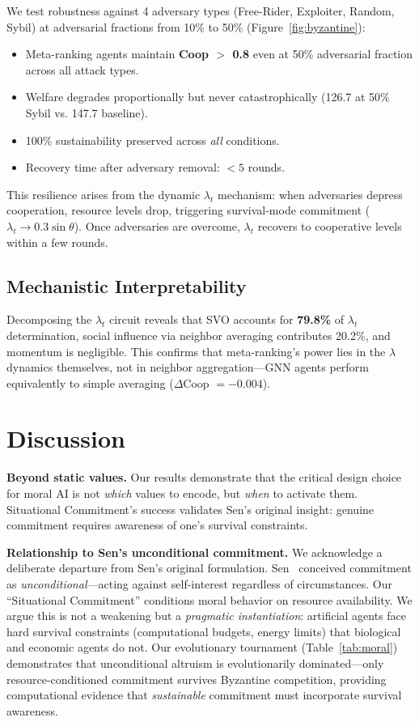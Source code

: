 \documentclass{article}
\begin{document}
We test robustness against 4 adversary types (Free-Rider, Exploiter, Random, Sybil) at adversarial fractions from 10\% to 50\% (Figure~\ref{fig:byzantine}):

\begin{itemize}
    \item Meta-ranking agents maintain \textbf{Coop $>$ 0.8} even at 50\% adversarial fraction across all attack types.
    \item Welfare degrades proportionally but never catastrophically (126.7 at 50\% Sybil vs. 147.7 baseline).
    \item 100\% sustainability preserved across \textit{all} conditions.
    \item Recovery time after adversary removal: $< 5$ rounds.
\end{itemize}

This resilience arises from the dynamic $\lambda_t$ mechanism: when adversaries depress cooperation, resource levels drop, triggering survival-mode commitment ($\lambda_t \to 0.3\sin\theta$). Once adversaries are overcome, $\lambda_t$ recovers to cooperative levels within a few rounds.

\subsection{Mechanistic Interpretability}

Decomposing the $\lambda_t$ circuit reveals that SVO accounts for \textbf{79.8\%} of $\lambda_t$ determination, social influence via neighbor averaging contributes 20.2\%, and momentum is negligible. This confirms that meta-ranking's power lies in the $\lambda$ dynamics themselves, not in neighbor aggregation---GNN agents perform equivalently to simple averaging ($\Delta$Coop $= -0.004$).

\section{Discussion}

\textbf{Beyond static values.} Our results demonstrate that the critical design choice for moral AI is not \textit{which} values to encode, but \textit{when} to activate them. Situational Commitment's success validates Sen's original insight: genuine commitment requires awareness of one's survival constraints.

\textbf{Relationship to Sen's unconditional commitment.} We acknowledge a deliberate departure from Sen's original formulation. Sen~\cite{sen1977rational} conceived commitment as \textit{unconditional}---acting against self-interest regardless of circumstances. Our ``Situational Commitment'' conditions moral behavior on resource availability. We argue this is not a weakening but a \textit{pragmatic instantiation}: artificial agents face hard survival constraints (computational budgets, energy limits) that biological and economic agents do not. Our evolutionary tournament (Table~\ref{tab:moral}) demonstrates that unconditional altruism is evolutionarily dominated---only resource-conditioned commitment survives Byzantine competition, providing computational evidence that \textit{sustainable} commitment must incorporate survival awareness.
\end{document}
